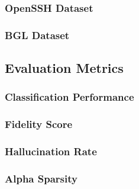 \subsubsection{OpenSSH Dataset}


\subsubsection{BGL Dataset}


\subsection{Evaluation Metrics}\label{sec:evaluation-metrics}


\subsubsection{Classification Performance}


\subsubsection{Fidelity Score}


\subsubsection{Hallucination Rate}


\subsubsection{Alpha Sparsity}

